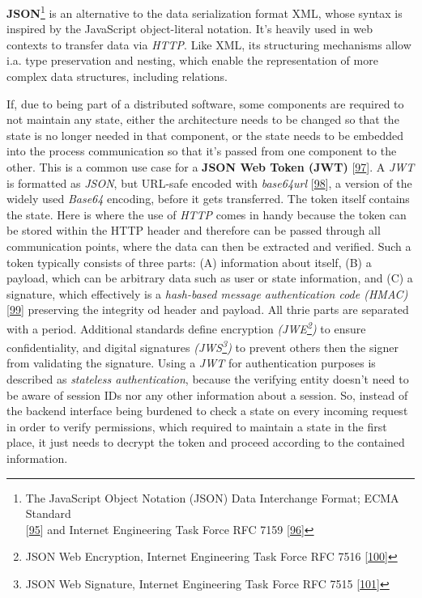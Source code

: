 \documentclass[12pt,english,a4paper,titlepage,cleardoublepage=empty,dottedtoc]{report}
\begin{document}
\textbf{JSON}\footnote{The JavaScript Object Notation (JSON) Data
  Interchange Format; ECMA Standard\\
  {[}\protect\hyperlink{ref-web_spec_json}{95}{]} and Internet
  Engineering Task Force RFC 7159
  {[}\protect\hyperlink{ref-web_rfc_json}{96}{]}} is an alternative to
the data serialization format XML, whose syntax is inspired by the
JavaScript object-literal notation. It's heavily used in web contexts to
transfer data via \emph{HTTP}. Like XML, its structuring mechanisms
allow i.a. type preservation and nesting, which enable the
representation of more complex data structures, including relations.

If, due to being part of a distributed software, some components are
required to not maintain any state, either the architecture needs to be
changed so that the state is no longer needed in that component, or the
state needs to be embedded into the process communication so that it's
passed from one component to the other. This is a common use case for a
\textbf{\protect\hypertarget{def--jwt}{}{JSON Web Token (JWT)}}
{[}\protect\hyperlink{ref-web_spec_json-web-token}{97}{]}. A \emph{JWT}
is formatted as \emph{JSON}, but URL-safe encoded with \emph{base64url}
{[}\protect\hyperlink{ref-web_spec_base64url}{98}{]}, a version of the
widely used \emph{Base64} encoding, before it gets transferred. The
token itself contains the state. Here is where the use of \emph{HTTP}
comes in handy because the token can be stored within the HTTP header
and therefore can be passed through all communication points, where the
data can then be extracted and verified. Such a token typically consists
of three parts: (A) information about itself, (B) a payload, which can
be arbitrary data such as user or state information, and (C) a
signature, which effectively is a \emph{hash-based message
authentication code (HMAC)}
{[}\protect\hyperlink{ref-web_spec_hmac}{99}{]} preserving the integrity
od header and payload. All thrie parts are separated with a period.
Additional standards define encryption \emph{(JWE\footnote{JSON Web
  Encryption, Internet Engineering Task Force RFC 7516
  {[}\protect\hyperlink{ref-web_spec_json-web-encryption}{100}{]}})} to
ensure confidentiality, and digital signatures \emph{(JWS\footnote{JSON
  Web Signature, Internet Engineering Task Force RFC 7515
  {[}\protect\hyperlink{ref-web_spec_json-web-signature}{101}{]}})} to
prevent others then the signer from validating the signature. Using a
\emph{JWT} for authentication purposes is described as \emph{stateless
authentication}, because the verifying entity doesn't need to be aware
of session IDs nor any other information about a session. So, instead of
the backend interface being burdened to check a state on every incoming
request in order to verify permissions, which required to maintain a
state in the first place, it just needs to decrypt the token and proceed
according to the contained information.
\end{document}

